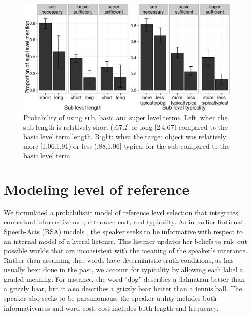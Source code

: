 \documentclass[10pt,letterpaper]{article}
\begin{document}
\begin{figure}[bt]
\centering
\includegraphics[width=.5\textwidth]{graphs/length-typicality}
\caption{Probability of using sub, basic and super level terms. Left: when the sub  length is relatively short (.67,2] or long [2,4.67) compared to the basic level term length. Right: when the target object was relatively more [1.06,1.91) or less (.88,1.06] typical for the sub compared to the basic level term.}
 \label{fig:lengthtypicality}
\end{figure}


\section{\bf Modeling level of reference}

We formulated a probabilistic model of reference level selection that integrates contextual informativeness, utterance cost, and typicality.
As in earlier Rational Speech-Acts (RSA) models \cite{frank2012, goodmanstuhlmueller2013}, the speaker seeks to be informative with respect to an internal model of a literal listener. This listener updates her beliefs to rule out possible worlds that are inconsistent with the meaning of the speaker's utterance. Rather than assuming that words have deterministic truth conditions, as has usually been done in the past, we account for typicality by allowing each label a graded meaning. For instance, the word ``dog'' describes a dalmatian better than a grizzly bear, but it also describes a grizzly bear better than a tennis ball.
The speaker also seeks to be parsimonious: the speaker utility includes both informativeness and word cost; cost includes both length and frequency.
\end{document}
